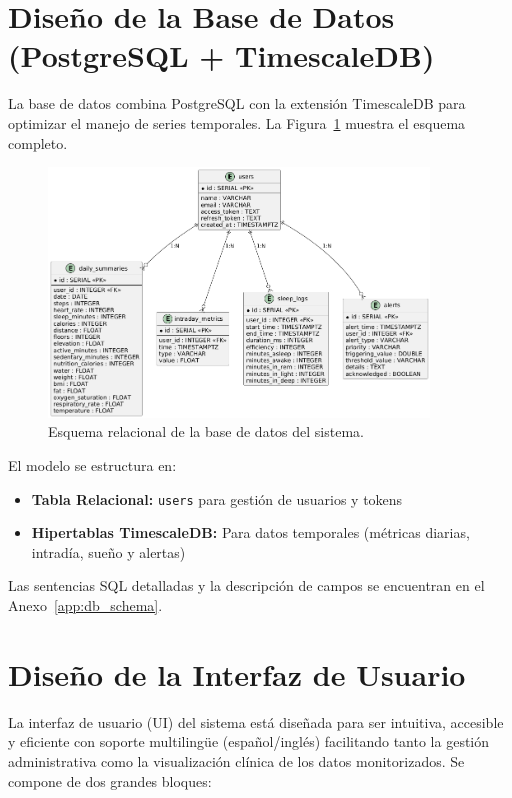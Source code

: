 \section{Diseño de la Base de Datos (PostgreSQL + TimescaleDB)}
\label{sec:diseno_bd}

La base de datos combina PostgreSQL con la extensión TimescaleDB para optimizar el manejo de series temporales. La Figura~\ref{fig:esquema_relacional} muestra el esquema completo.

\begin{figure}[htbp]
    \centering
    \includegraphics[width=0.9\textwidth]{imagenes/esquema_relacional.png}
    \caption{Esquema relacional de la base de datos del sistema.}
    \label{fig:esquema_relacional}
\end{figure}

El modelo se estructura en:
\begin{itemize}
    \item \textbf{Tabla Relacional:} \texttt{users} para gestión de usuarios y tokens
    \item \textbf{Hipertablas TimescaleDB:} Para datos temporales (métricas diarias, intradía, sueño y alertas)
\end{itemize}

Las sentencias SQL detalladas y la descripción de campos se encuentran en el Anexo~\ref{app:db_schema}.


\section{Diseño de la Interfaz de Usuario}
\label{sec:diseno_ui}

La interfaz de usuario (UI) del sistema está diseñada para ser intuitiva, accesible y eficiente con soporte multilingüe (español/inglés) facilitando tanto la gestión administrativa como la visualización clínica de los datos monitorizados. Se compone de dos grandes bloques:

